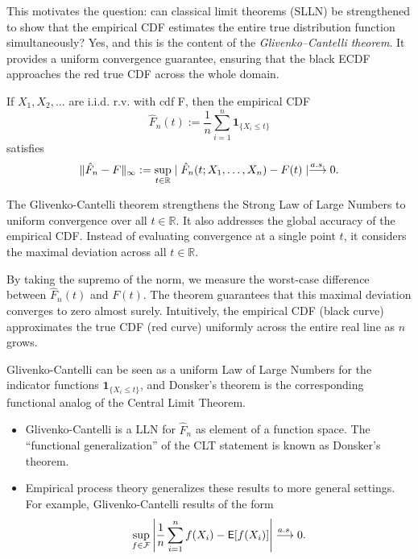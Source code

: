 This motivates the question: can classical limit theorems (SLLN) be strengthened to show that the empirical CDF estimates the entire true distribution function simultaneously? Yes, and this is the content of the \emph{Glivenko–Cantelli theorem}. It provides a uniform convergence guarantee, ensuring that the black ECDF approaches the red true CDF across the whole domain.

\begin{theo}
\label{theo:Glivenko-Cantelli}
    If \(X_1,X_2, \dots \) are i.i.d. r.v. with cdf F, 
then the empirical CDF
\[
\hat{F}_n(t) := \frac{1}{n} \sum_{i=1}^{n} \mathbf{1}_{\{X_i \le t\}}
\]
satisfies
    \[
        \|\hat{F}_{n}-F\|_{\infty} := \sup\limits_{t \in \mathbb{R}} \mid \hat{F}_{n}(t;X_1,\dots ,X_{n}) - F(t)\mid \overset{a.s.}{\longrightarrow}0.
    \]
\end{theo}

The Glivenko-Cantelli theorem strengthens the Strong Law of Large Numbers to uniform convergence over all \(t \in \mathbb{R}\).  
It also addresses the global accuracy of the empirical CDF. Instead of evaluating convergence at a single point \(t\), it considers the maximal deviation across all \(t \in \mathbb{R}\).  

By taking the supremo of the norm, we measure the worst-case difference between \(\hat{F}_n(t)\) and \(F(t)\). The theorem guarantees that this maximal deviation converges to zero almost surely.  
Intuitively, the empirical CDF (black curve) approximates the true CDF (red curve) uniformly across the entire real line as \(n\) grows.  

Glivenko-Cantelli can be seen as a uniform Law of Large Numbers for the indicator functions \(\mathbf{1}_{\{X_i \le t\}}\), and Donsker's theorem is the corresponding functional analog of the Central Limit Theorem.  

\begin{remark}[]
    \leavevmode
    \begin{itemize}
    \item Glivenko-Cantelli is a LLN for \(\hat{F}_{n}\) as element of a function space. The ``functional generalization'' of the CLT statement is known as Donsker's theorem.
    \item Empirical process theory generalizes these results to more general settings. For example, Glivenko-Cantelli results of the form \[
            \sup\limits_{f \in \mathcal{F}} \left|\frac{1}{n} \sum\limits_{i=1}^{n} f(X_{i}) - \mathsf{E}[f(X_{i})] \right| \overset{a.s.}{\longrightarrow}0.
    \]
    \end{itemize}
\end{remark}


